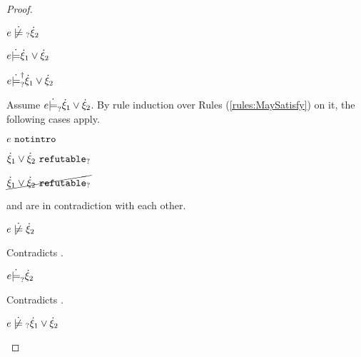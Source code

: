 \begin{proof}
\begin{byCases}
\begin{byCases}
\begin{pfsteps*}
        \item $\cnotmaysatisfy{e}{\hxi_2}$  
        \item $e \dot{\models} \dot{\xi}_1 \vee \dot{\xi}_2$  
        \item $e \dot{\models}_{?}^{\dag} \dot{\xi}_1 \vee \dot{\xi}_2$ 
        \end{pfsteps*}
        Assume $e \dot{\models}_{?} \dot{\xi}_1 \vee \dot{\xi}_2$. By rule induction over Rules (\ref{rules:MaySatisfy}) on it, the following cases apply.
        \begin{byCases}
        \item[\text{(\ref{rule:CMSNotIntro})}]
            \begin{pfsteps*}
            \item $e ~\mathtt{notintro}$  
            \item $\dot{\xi}_1 \vee \dot{\xi}_2 ~\mathtt{refutable}_?$  
            \item $\cancel{\dot{\xi}_1 \vee \dot{\xi}_2 ~\mathtt{refutable}_?}$  
            \end{pfsteps*}
             and  are in contradiction with each other.
        \item[\text{(\ref{rule:CMSOr1})}]
            \begin{pfsteps*}
            \item $\cnotsatisfy{e}{\hxi_2}$ 
            \end{pfsteps*}
            Contradicts .
        \item[\text{(\ref{rule:CMSOr2})}]
            \begin{pfsteps*}
            \item $e \dot{\models}_{?} \dot{\xi}_2$ 
            \end{pfsteps*}
            Contradicts .
        \end{byCases}
        \begin{pfsteps*}
        \item $\cnotmaysatisfy{e}{\cor{\hxi_1}{\hxi_2}}$ 
        \end{pfsteps*}
        

\end{byCases}
\end{byCases}
\end{proof}
